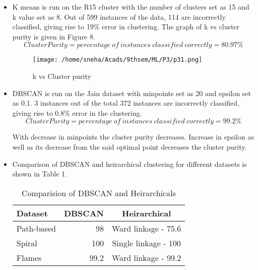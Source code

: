 \documentclass[12pt]{article}
\begin{document}
\begin{itemize}
\item{
K means is run on the R15 cluster with the number of clusters set as 15 and k value set as 8. Out of 599 instances of the data, 114 are incorrectly classified, giving rise to 19\% error in clustering. The graph of k vs cluster purity is given in Figure 8.
\begin{equation}
Cluster Purity = percentage\ of\ instances\ classified\ correctly = 80.97\%
\end{equation}
\begin{figure}
	\centering
		\texttt{[image: /home/sneha/Acads/9thsem/ML/P3/p31.png]}
	\caption{k vs Cluster purity}
	
\end{figure}

}

\item{
DBSCAN is run on the Jain dataset with minpoints set as 20 and epsilon set as 0.1. 3 instances out of the total 372 instances are incorrectly classified, giving rise to 0.8\% error in the clustering.
\begin{equation}
Cluster Purity = percentage\ of\ instances\ classified\ correctly = 99.2\%
\end{equation}

With decrease in minpoints the cluster purity decreases. Increase in epsilon as well as its decrease from the said optimal point decreases the cluster purity.
}


\item{Comparison of DBSCAN and heirarchical clustering for different datasets is shown in Table 1.
\begin{table}
\centering
		\begin{tabular}{|l | r| c|}
			\hline
		\textbf{Dataset} & \textbf{DBSCAN} & \textbf{Heirarchical} \\ \hline
			 Path-based &  98 & Ward linkage - 75.6 \\ \hline
			Spiral & 100  & Single linkage - 100\\ \hline
			Flames & 99.2 & Ward linkage - 99.2  \\ \hline
			
			
		\end{tabular}
	\caption{Comparision of DBSCAN and Heirarchicals}

\end{table}
}




\end{itemize}
\end{document}
